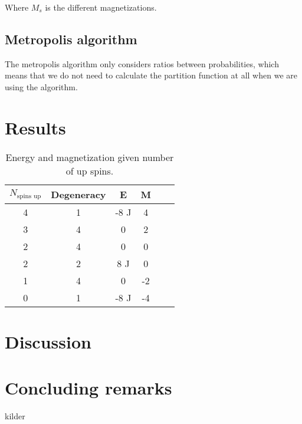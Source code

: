 \documentclass{article}
\begin{document}
\begin{multicols}{2}
Where $M_s$ is the different magnetizations. 

\subsection{Metropolis algorithm}

The metropolis algorithm only considers ratios between probabilities, which means that we do not need to calculate the partition function at all when we are using the algorithm. 

\section{Results}

\begin{table}[H]
\begin{center}
\caption{Energy and magnetization given number of up spins.}
\begin{tabular}{  |c|c|c|c|c|c| } \hline
$N_{\text{spins up}}$&Degeneracy&E&M \\ \hline
4&1&-8 J&4\\ \hline
3&4&0 &2 \\ \hline
2&4&0&0\\ \hline
2&2&8 J&0\\ \hline
1&4&0&-2\\ \hline
0&1&-8 J&-4\\ \hline
\end{tabular}
\label{tab:up_spins}
\end{center}
\end{table}

\section{Discussion}

\section{Concluding remarks}

\end{multicols}

\begin{thebibliography}{9}
	kilder
\end{thebibliography}
\end{document}
